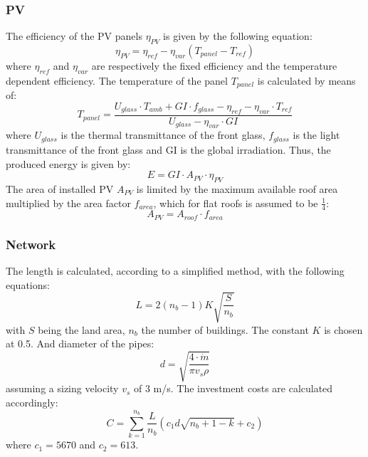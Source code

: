 \documentclass{article}
\begin{document}
\subsubsection{PV}
The efficiency of the PV panels $\eta_{PV}$ is given by the following equation\cite{stadlerModelbasedOptimizationDistributed2016}:
\begin{equation}
	\eta_{PV} = \eta_{ref} - \eta_{var} (T_{panel}-T_{ref})
\end{equation}
where $\eta_{ref}$ and $\eta_{var}$ are respectively the fixed efficiency and the temperature dependent efficiency. The temperature of the panel $T_{panel}$ is calculated by means of:
\begin{equation}
	T_{panel} = \frac{U_{glass}\cdot T_{amb} + GI \cdot f_{glass}-\eta_{ref} - \eta_{var} \cdot T_{ref}}{U_{glass}-\eta_{var} \cdot GI}
\end{equation}
where $U_{glass}$ is the thermal transmittance of the front glass, $f_{glass}$ is the light transmittance of the front glass and GI is the global irradiation.
Thus, the produced energy is given by:
\begin{equation}
	E = GI \cdot A_{PV} \cdot  \eta_{PV}
\end{equation}
The area of installed PV $A_{PV}$ is limited by the maximum available roof area multiplied by the area factor $f_{area}$, which for flat roofs is assumed to be $\frac{1}{4}$:
\begin{equation}
	A_{PV} = A_{roof} \cdot f_{area}
\end{equation}


\subsubsection{Network}\label{sss:net}
The length is calculated, according to a simplified method\cite{girardinEnerGisGeographicalInformation2010}, with the following equations:
\begin{equation}
L = 2(n_{b}-1)K\sqrt{\frac{S}{n_{b}}}
\end{equation}
with $S$ being the land area, $n_{b}$ the number of buildings. The constant $K$ is chosen at 0.5.
And diameter of the pipes:
\begin{equation}
d = \sqrt{\frac{4\cdot \dot{m}}{\pi v_{s} \rho}}
\end{equation}
assuming a sizing velocity $v_{s}$ of 3 m/s.
The investment costs are calculated accordingly:
\begin{equation}
C = \sum_{k=1}^{n_{b}} \frac{L}{n_{b}} (c_{1} d \sqrt{n_{b}+1-k} + c_{2})
\end{equation}
where $c_{1} =5670 $ and $c_{2} = 613 $.\\
\end{document}
